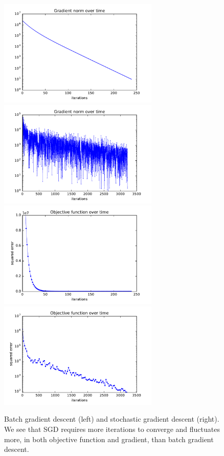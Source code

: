 \documentclass{article}
\begin{document}
\begin{multicols}{2}
\begin{figure}
   \centering
   \includegraphics[width=3in]{img/1-1-batch.pdf}
   \includegraphics[width=3in]{img/1-1-stoch.pdf}
   \includegraphics[width=3in]{img/1-1-batch-func.pdf}
   \includegraphics[width=3in]{img/1-1-stoch-func.pdf}
   \caption{Batch gradient descent (left) and stochastic gradient descent (right). We see that SGD requires more iterations to converge and fluctuates more, in both objective function and gradient, than batch gradient descent.} %
   \label{fig:1.2}
\end{figure}




\end{multicols}
\end{document}

